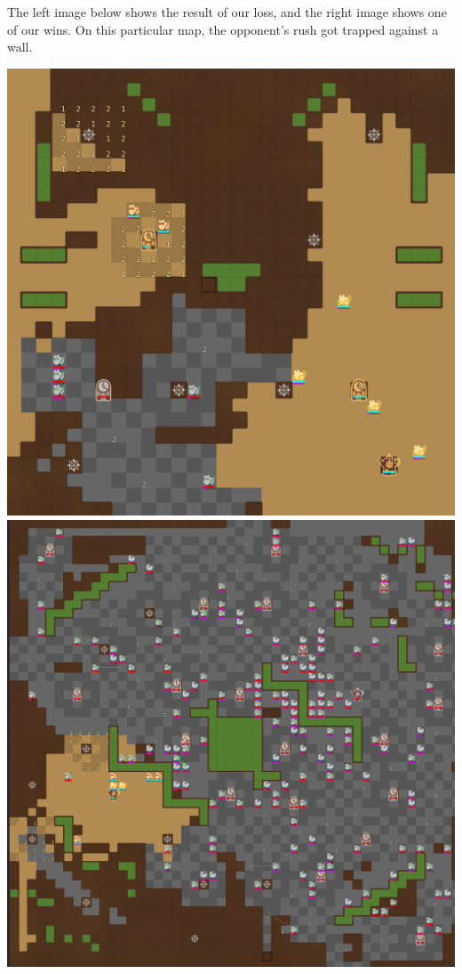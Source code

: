   The left image below shows the result of our loss, and the right image shows one of our wins. On this particular map, the opponent's rush got trapped against a wall.
  \begin{center}
    \includegraphics[scale=0.1]{images/sprint1_loss.png}
    \includegraphics[scale=0.1]{images/sprint1_win.png}
  \end{center}
